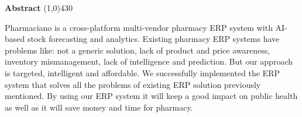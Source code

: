 \setlength{\headheight}{14pt}
\begin{center}
	{\huge \bf Abstract}
	\line(1,0){430}
\end{center}

Pharmaciano is a cross-platform multi-vendor pharmacy ERP system with AI-based stock forecasting and analytics. Existing pharmacy ERP systems have problems like: not a generic solution, lack of product and price awareness, inventory mismanagement, lack of intelligence and prediction. But our approach is targeted, intelligent and affordable. We successfully implemented the ERP system that solves all the problems of existing ERP solution previously mentioned. By using our ERP system it will keep a good impact on public health as well as it will save money and time for pharmacy. 
\clearpage
\setlength{\headheight}{12pt}